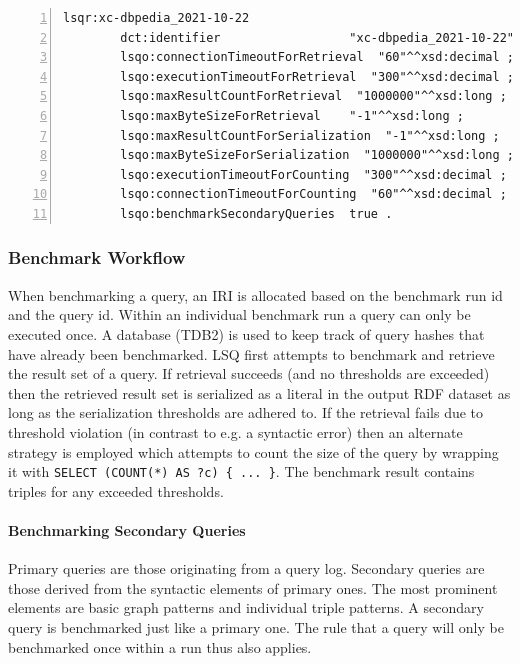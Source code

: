 \begin{lstlisting}[label=lst:lsq-bench-conf, caption=Excerpt of benchmark configuration options, style=lst, language=ttl, float=*, numbers=left]
lsqr:xc-dbpedia_2021-10-22
        dct:identifier                  "xc-dbpedia_2021-10-22" ;
        lsqo:connectionTimeoutForRetrieval  "60"^^xsd:decimal ;
        lsqo:executionTimeoutForRetrieval  "300"^^xsd:decimal ;
        lsqo:maxResultCountForRetrieval  "1000000"^^xsd:long ;
        lsqo:maxByteSizeForRetrieval    "-1"^^xsd:long ;
        lsqo:maxResultCountForSerialization  "-1"^^xsd:long ;
        lsqo:maxByteSizeForSerialization  "1000000"^^xsd:long ;
        lsqo:executionTimeoutForCounting  "300"^^xsd:decimal ;
        lsqo:connectionTimeoutForCounting  "60"^^xsd:decimal ;
        lsqo:benchmarkSecondaryQueries  true .
\end{lstlisting}
\subsubsection{Benchmark Workflow}
When benchmarking a query, an IRI is allocated based on the benchmark run id and the query id.
Within an individual benchmark run a query can only be executed once. A database (TDB2) is used to keep track of query hashes that have already been benchmarked.
LSQ first attempts to benchmark and retrieve the result set of a query. 
If retrieval succeeds (and no thresholds are exceeded) then the retrieved result set is serialized as a literal in the output RDF dataset as long as the serialization thresholds are adhered to.
If the retrieval fails due to threshold violation (in contrast to e.g. a syntactic error) then an alternate strategy is employed which attempts to count the size of the query by wrapping it with \texttt{SELECT (COUNT(*) AS ?c) \{ ... \}}. The benchmark result contains triples for any exceeded thresholds.

\paragraph{Benchmarking Secondary Queries} Primary queries are those originating from a query log. Secondary queries are those derived from the syntactic elements of primary ones. The most prominent elements are basic graph patterns and individual triple patterns. A secondary query is benchmarked just like a primary one. The rule that a query will only be benchmarked once within a run thus also applies.



